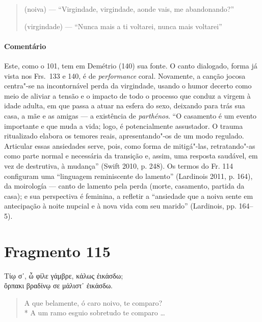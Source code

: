 {\begin{verse}
(noiva) --- ``Virgindade, virgindade, aonde vais, me abandonando?''

(virgindade) --- ``Nunca mais a ti voltarei, nunca mais voltarei''
\end{verse}

{\paragraph{Comentário} Este, como o 101, tem em Demétrio (140) sua fonte. O canto dialogado, forma já vista
nos Frs.~133 e 140, é de \textit{performance} coral. Novamente, a canção jocosa
centra"-se na incontornável perda da virgindade, usando o humor decerto como
meio de aliviar a tensão e o impacto de todo o processo que conduz a virgem à
idade adulta, em que passa a atuar na esfera do sexo, deixando para trás sua casa, a mãe e as amigas --- a existência de \textit{parthénos}.
“O casamento é um evento importante e que muda a vida; logo, é potencialmente assustador. O trauma ritualizado elabora os temores reais, apresentando"-os de um modo regulado. Articular essas ansiedades serve, pois, como forma de mitigá"-las, retratando"-as como parte normal e necessária da transição e, assim, uma resposta saudável, em vez de destrutiva, à mudança” (Swift 2010, p. 248).
Os termos do Fr. 114 configuram uma “linguagem reminiscente do lamento” (Lardinois 2011, p. 164), da moirología --- canto de lamento pela perda (morte, casamento, partida da casa); e sua perspectiva é feminina, a refletir a “ansiedade que a noiva sente em antecipação à noite nupcial e à nova vida com seu marido” (Lardinois, pp. 164--5).}



\pagebreak
\section{Fragmento 115}

\begin{gkverse}
Τίῳ σ᾿, ὦ φίλε γάμβρε, κάλως ἐικάσδω;\\
ὄρπακι βραδίνῳ σε μάλιστ᾿ ἐικάσδω.
\end{gkverse}

\begin{verse}
A que belamente, ó caro noivo, te comparo?\\*
A um ramo esguio sobretudo te comparo \ldots{}
\end{verse}

}
